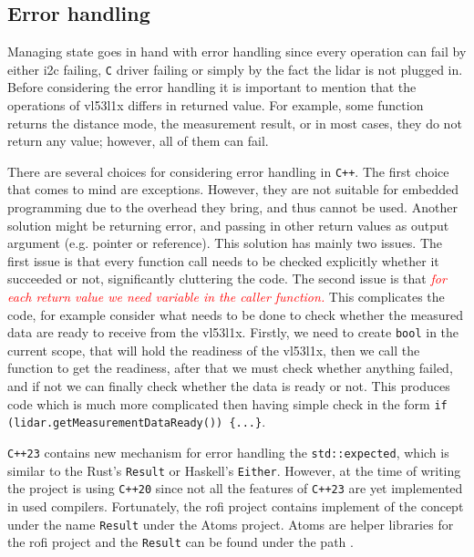 \documentclass[
  digital,     %
  oneside,     %
  nosansbold,  %
  nocolorbold, %
  lof,         %
  lot,         %
]{fithesis4}
\newcommand{\TODO}[1]{\textcolor{red}{\textit{#1}}}
\begin{document}
{{{\subsection{Error handling}
Managing state goes in hand with error handling since every operation can fail by either \acrshort{i2c} failing, \verb|C| driver failing or simply by the fact the \acrshort{lidar} is not plugged in. Before considering the error handling it is important to mention that the operations of \gls{vl53l1x} differs in returned value. For example, some function returns the distance mode, the measurement result, or in most cases, they do not return any value; however, all of them can fail.

There are several choices for considering error handling in \verb|C++|. The first choice that comes to mind are exceptions. However, they are not suitable for embedded programming due to the overhead they bring, and thus cannot be used. Another solution might be returning error, and passing in other return values as output argument (e.g. pointer or reference). This solution has mainly two issues. The first issue is that every function call needs to be checked explicitly whether it succeeded or not, significantly cluttering the code. The second issue is that \TODO{for each return value we need variable in the caller function.} This complicates the code, for example consider what needs to be done to check whether the measured data are ready to receive from the \gls{vl53l1x}. Firstly, we need to create \lstinline|bool| in the current scope, that will hold the readiness of the \gls{vl53l1x}, then we call the function to get the readiness, after that we must check whether anything failed, and if not we can finally check whether the data is ready or not. This produces code which is much more complicated then having simple check in the form \lstinline[breaklines=false]|if (lidar.getMeasurementDataReady()) {...}|.

\verb|C++23| contains new mechanism for error handling the \lstinline|std::expected|, which is similar to the Rust's \lstinline|Result| or Haskell's \lstinline|Either|. However, at the time of writing the project is using \verb|C++20| since not all the features of \verb|C++23| are yet implemented in used compilers. Fortunately, the \acrshort{rofi} project contains implement of the concept under the name \lstinline|Result| under the Atoms project. Atoms are helper libraries for the \acrshort{rofi} project and the \lstinline|Result| can be found under the path .

}}}
\end{document}
